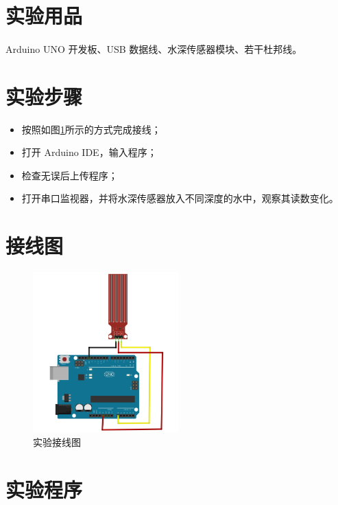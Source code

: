 \documentclass[UTF8, oneside]{ctexbook}
\begin{document}
\section{实验用品}
\paragraph{}
Arduino UNO 开发板、USB 数据线、水深传感器模块、若干杜邦线。

\section{实验步骤}
\begin{itemize}
    \item[(1)] 按照如图\ref{s15_line}所示的方式完成接线；
    \item[(2)] 打开 Arduino IDE，输入程序；
    \item[(3)] 检查无误后上传程序；
    \item[(4)] 打开串口监视器，并将水深传感器放入不同深度的水中，观察其读数变化。
\end{itemize}

\section{接线图}
\begin{figure}[h]
    \centering
    \includegraphics[width=0.5\textwidth]{./result/sensor/15/lines.png}
    \caption{实验接线图}
    \label{s15_line}
\end{figure}

\section{实验程序}

\end{document}
